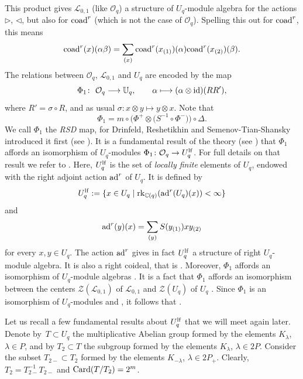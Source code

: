 \documentclass[10pt,a4paper]{amsart}
\numberwithin{equation}{section}
\theoremstyle{definition}
\newcommand{\mUq}{\mathbb{U}_q}
\newcommand{\mc}{\mathbb{C}}
\newcommand{\Ll}{{\mathcal L}}
\newcommand{\Oo}{{\mathcal O}}
\newcommand{\ra}{\rightarrow}
\begin{document}
This product gives $\Ll_{0,1}$ (like $\Oo_q$) a structure of $U_q$-module algebra for the actions $\rhd$, $\lhd$, but also for ${\rm coad}^r$ (which is not the case of $\Oo_q$). Spelling this out for ${\rm coad}^r$, this means
\[{\rm coad}^r(x)(\alpha\beta)=\sum_{(x)}{\rm coad}^r(x_{(1)})(\alpha){\rm coad}^r(x_{(2)})(\beta).\]
The relations between $\Oo_q$, $\Ll_{0,1}$ and $U_q$ are encoded by the map
\begin{equation}\label{phi1def}
\Phi_1\colon\ \Oo_q\longrightarrow \mUq, \qquad \alpha\longmapsto(\alpha \otimes {\rm id})(RR'),
\end{equation}
where $R' = \sigma\circ R$, and as usual $\sigma\colon x\otimes y \mapsto y\otimes x$. Note that
\begin{equation}\label{RSDmapdef}
\Phi_1 = m\circ \big(\Phi^+\otimes \big(S^{-1}\circ \Phi^-{}\big)\big)\circ \Delta.
\end{equation}
We call $\Phi_1$ the {\it RSD} map, for Drinfeld, Reshetikhin and Semenov-Tian-Shansky introduced it first (see \cite{Dr,Maj,RSTS}). It is a fundamental result of the theory (see \cite{Bau1,Ca,Jos}) that $\Phi_1$ affords an isomorphism of $U_q$-modules
$\Phi_1\colon \Oo_q \ra U_q^{\rm lf}$.
For full details on that result we refer to \cite[Section 3.12]{VY}. Here, $U_q^{\rm lf}$ is the set of \emph{locally finite} elements of $U_q$, endowed with the right adjoint action ${\rm ad}^r$ of $U_q$. It is defined by
\[U_q^{\rm lf} :=\{x\in U_q\mid {\rm rk}_{\mc(q)}({\rm ad}^r(U_q)(x)) < \infty\}\]
and
\[{\rm ad}^r(y)(x) = \sum_{(y)}{S}(y_{(1)}) x y_{(2)}\]
for every $x,y \in U_q$. The action ${\rm ad}^r$ gives in fact $U_q^{\rm lf}$ a structure of right $U_q$-module algebra. It is also a right coideal, that is . Moreover, $\Phi_1$ affords an isomorphism of $U_q$-module algebras \smash{$
\Phi_1\colon \Ll_{0,1} \ra U_q^{\rm lf}$}.
It is a fact that $\Phi_1$ affords an isomorphism between the centers $\mathcal{Z}(\Ll_{0,1})$ of $\Ll_{0,1}$ and $\mathcal{Z}(U_q)$ of $U_q$ \cite[Proposition~6.24]{BR}. Since $\Phi_1$ is an isomorphism of $U_q$-modules and , it follows that \smash{$\mathcal{Z}(\Ll_{0,1}) = \Ll_{0,1}^{U_q}$}.

Let us recall a few fundamental results about $U_q^{\rm lf}$ that we will meet again later. Denote by~${T\subset U_q}$ the multiplicative Abelian group formed by the elements $K_{\lambda}$, $\lambda \in P$, and by $T_2\subset T$ the subgroup formed by the elements $K_{\lambda}$, $\lambda \in 2P$. Consider the subset $T_{2-} \subset T_2$ formed by the elements $K_{-\lambda}$, $\lambda \in 2P_+$. Clearly, $T_2 = T_{2-}^{-1}T_{2-}$ and ${\rm Card}(T/T_2) = 2^m$.
\end{document}
